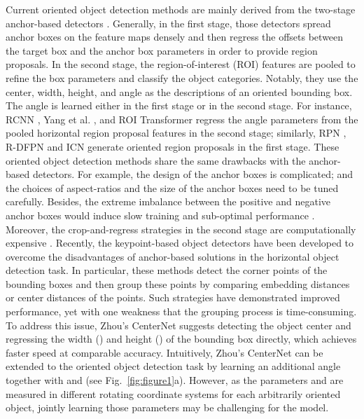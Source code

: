 \documentclass[10pt,twocolumn,letterpaper]{article}
\begin{document}
Current oriented object detection methods are mainly derived from the two-stage anchor-based detectors \cite{girshick2014rich,girshick2015fast,ren2015faster}. Generally, in the first stage, those detectors spread anchor boxes on the feature maps densely and then regress the offsets between the target box and the anchor box parameters in order to provide region proposals. In the second stage, the region-of-interest (ROI) features are pooled to refine the box parameters and classify the object categories. Notably, they use the center, width, height, and angle as the descriptions of an oriented bounding box. The angle is learned either in the first stage or in the second stage. For instance, RCNN \cite{jiang2017r2cnn}, Yang et al. \cite{yang2018position}, and ROI Transformer \cite{ding2019learning} regress the angle parameters from the pooled horizontal region proposal features in the second stage; similarly, RPN \cite{zhang2018toward}, R-DFPN \cite{yang2018automatic} and ICN \cite{azimi2018towards} generate oriented region proposals in the first stage. These oriented object detection methods share the same drawbacks with the anchor-based detectors. For example, the design of the anchor boxes is complicated; and the choices of aspect-ratios and the size of the anchor boxes need to be tuned carefully. Besides, the extreme imbalance between the positive and negative anchor boxes would induce slow training and sub-optimal performance \cite{duan2019centernet}. Moreover, the crop-and-regress strategies in the second stage are computationally expensive \cite{zhou2019bottom}. Recently, the keypoint-based object detectors \cite{law2018cornernet,zhou2019bottom,duan2019centernet} have been developed to overcome the disadvantages of anchor-based solutions \cite{ren2015faster,liu2016ssd,yi2019assd} in the horizontal object detection task. In particular, these methods detect the corner points of the bounding boxes and then group these points by comparing embedding distances or center distances of the points. Such strategies have demonstrated improved performance, yet with one weakness that the grouping process is time-consuming. To address this issue, Zhou's CenterNet \cite{zhou2019objects} suggests detecting the object center and regressing the width () and height () of the bounding box directly, which achieves faster speed at comparable accuracy. Intuitively, Zhou's CenterNet can be extended to the oriented object detection task by learning an additional angle  together with  and  (see Fig.~\ref{fig:figure1}a). However, as the parameters  and  are measured in different rotating coordinate systems for each arbitrarily oriented object, jointly learning those parameters may be challenging for the model.
\end{document}
